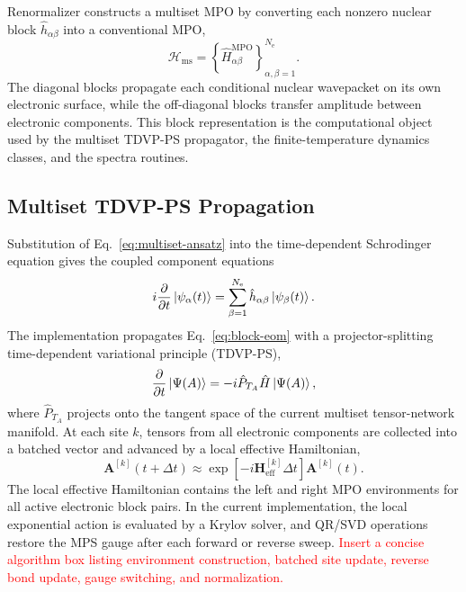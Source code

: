 \documentclass[journal=jctcce,manuscript=article]{achemso}
\newcommand{\placeholder}[1]{\textcolor{red}{#1}}
\begin{document}
Renormalizer constructs a multiset MPO by converting each nonzero nuclear block \(\hat h_{\alpha\beta}\) into a conventional MPO,
\begin{equation}
    \mathcal H_{\mathrm{ms}} = \left\{\hat H^{\mathrm{MPO}}_{\alpha\beta}\right\}_{\alpha,\beta=1}^{N_{\mathrm e}}.
    \label{eq:multiset-mpo}
\end{equation}
The diagonal blocks propagate each conditional nuclear wavepacket on its own electronic surface, while the off-diagonal blocks transfer amplitude between electronic components. This block representation is the computational object used by the multiset TDVP-PS propagator, the finite-temperature dynamics classes, and the spectra routines.

\subsection{Multiset TDVP-PS Propagation}

Substitution of Eq.~\ref{eq:multiset-ansatz} into the time-dependent Schrodinger equation gives the coupled component equations
\begin{equation}
    i\frac{\partial}{\partial t}\ket{\psi_{\alpha}(t)}=
    \sum_{\beta=1}^{N_{\mathrm e}}\hat h_{\alpha\beta}\ket{\psi_{\beta}(t)}.
    \label{eq:block-eom}
\end{equation}
The implementation propagates Eq.~\ref{eq:block-eom} with a projector-splitting time-dependent variational principle (TDVP-PS),
\begin{equation}
    \frac{\partial}{\partial t}\ket{\Psi(A)}=-i\hat P_{T_A}\hat H\ket{\Psi(A)},
    \label{eq:tdvp-projector}
\end{equation}
where \(\hat P_{T_A}\) projects onto the tangent space of the current multiset tensor-network manifold. At each site \(k\), tensors from all electronic components are collected into a batched vector and advanced by a local effective Hamiltonian,
\begin{equation}
    \bm A^{[k]}(t+\Delta t) \approx
    \exp\left[-i\bm H^{[k]}_{\mathrm{eff}}\Delta t\right]\bm A^{[k]}(t).
    \label{eq:local-update}
\end{equation}
The local effective Hamiltonian contains the left and right MPO environments for all active electronic block pairs. In the current implementation, the local exponential action is evaluated by a Krylov solver, and QR/SVD operations restore the MPS gauge after each forward or reverse sweep. \placeholder{Insert a concise algorithm box listing environment construction, batched site update, reverse bond update, gauge switching, and normalization.}
\end{document}
